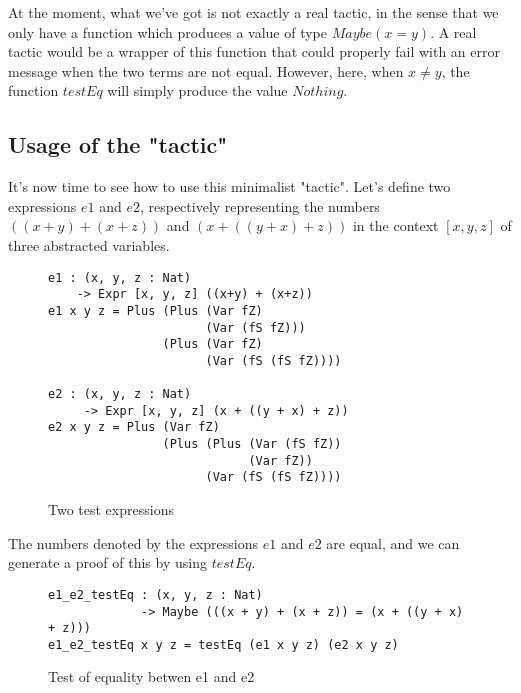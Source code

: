 At the moment, what we've got is not exactly a real tactic, in the sense that we only have a function which produces a value of type $Maybe (x = y)$. A real tactic would be a wrapper of this function that could properly fail with an error message when the two terms are not equal. However, here, when $x\ne y$, the function $testEq$ will simply produce the value $Nothing$. \\

\subsection{Usage of the "tactic"}

It's now time to see how to use this minimalist "tactic".
Let's define two expressions $e1$ and $e2$, respectively representing the numbers $((x + y) + (x + z))$ and $(x + ((y + x) + z))$ in the context $[x, y, z]$ of three abstracted variables.


\begin{figure}[H]
\figrule
\begin{center}
\begin{verbatim}
e1 : (x, y, z : Nat) 
    -> Expr [x, y, z] ((x+y) + (x+z))
e1 x y z = Plus (Plus (Var fZ) 
                      (Var (fS fZ))) 
                (Plus (Var fZ) 
                      (Var (fS (fS fZ))))

e2 : (x, y, z : Nat) 
     -> Expr [x, y, z] (x + ((y + x) + z))
e2 x y z = Plus (Var fZ) 
                (Plus (Plus (Var (fS fZ)) 
                            (Var fZ)) 
                      (Var (fS (fS fZ))))
\end{verbatim}
\end{center}
\caption{Two test expressions}
\figrule
\end{figure}

The numbers denoted by the expressions $e1$ and $e2$ are equal, and we can generate a proof of this by using $testEq$.

\begin{figure}[H]
\figrule
\begin{center}
\begin{verbatim}
e1_e2_testEq : (x, y, z : Nat) 
             -> Maybe (((x + y) + (x + z)) = (x + ((y + x) + z)))
e1_e2_testEq x y z = testEq (e1 x y z) (e2 x y z)
\end{verbatim}
\end{center}
\caption{Test of equality betwen e1 and e2}
\figrule
\end{figure}


